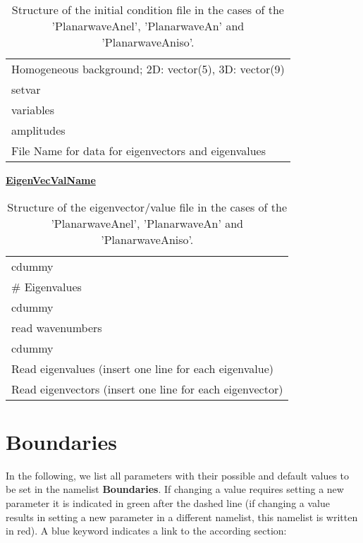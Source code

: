 \documentclass[12pt,twoside]{article}
\begin{document}
\begin{table}[H]
\caption{Structure of the initial condition file in the cases of the 'PlanarwaveAnel', 'PlanarwaveAn' and 'PlanarwaveAniso'.}
\begin{center}
\begin{tabular}{l}
\hline
Homogeneous background; 2D: vector(5), 3D: vector(9)\\
setvar\\
variables\\
amplitudes\\
File Name for data for eigenvectors and eigenvalues\\
\hline
\end{tabular}
\end{center}
\label{ini4-file}
\end{table}



\uline{\textbf{EigenVecValName}}

\begin{table}[H]
\caption{Structure of the eigenvector/value file in the cases of the 'PlanarwaveAnel', 'PlanarwaveAn' and 'PlanarwaveAniso'.}
\begin{center}
\begin{tabular}{l}
\hline
 cdummy\\
 \# Eigenvalues\\
 cdummy\\
 read wavenumbers\\
 cdummy\\
 Read eigenvalues (insert one line for each eigenvalue)\\
 Read eigenvectors (insert one line for each eigenvector)\\
\hline
\end{tabular}
\end{center}
\label{eigenvec2-file}
\end{table}


\newpage

\section{Boundaries}
\label{sec-block-bnd}

In the following, we list all parameters with their possible and default values to be set in the namelist \textbf{Boundaries}. 
If changing a value requires setting a new parameter it is indicated in green after the dashed line 
(if changing a value results in setting a new parameter in a different namelist, this namelist is written in red).
A blue keyword indicates a link to the according section:\\
\end{document}
